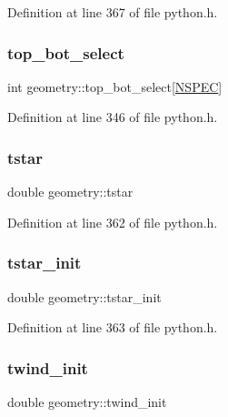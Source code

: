Definition at line 367 of file python.\+h.

\mbox{\label{structgeometry_a7ec4db1a56c0b84abac1c2d5411e05b0}} 
\subsubsection{\texorpdfstring{top\+\_\+bot\+\_\+select}{top\_bot\_select}}
{\footnotesize\ttfamily int geometry\+::top\+\_\+bot\+\_\+select\mbox{[}\hyperlink{python_8h_ade1df1cb82ae4ef9a5c0cddb37d9a73b}{N\+S\+P\+EC}\mbox{]}}



Definition at line 346 of file python.\+h.

\mbox{\label{structgeometry_a616dab8404be7333cecb406cd354d906}} 
\subsubsection{\texorpdfstring{tstar}{tstar}}
{\footnotesize\ttfamily double geometry\+::tstar}



Definition at line 362 of file python.\+h.

\mbox{\label{structgeometry_aa2d4d03230671a423ed0d287bc6c936d}} 
\subsubsection{\texorpdfstring{tstar\+\_\+init}{tstar\_init}}
{\footnotesize\ttfamily double geometry\+::tstar\+\_\+init}



Definition at line 363 of file python.\+h.

\mbox{\label{structgeometry_abb5c7c693f6694c7060addeefc8bc9b8}} 
\subsubsection{\texorpdfstring{twind\+\_\+init}{twind\_init}}
{\footnotesize\ttfamily double geometry\+::twind\+\_\+init}



